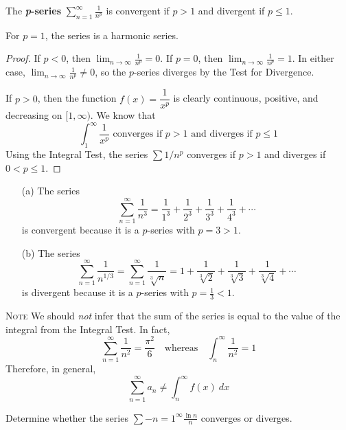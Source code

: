   \begin{definition}
    The \textbf{\textit{p}-series} $\displaystyle\sum_{n=1}^{\infty} \frac{1}{n^p}$ is convergent if $p>1$ and divergent if $p\leq 1$.
  \end{definition}
  For $p=1$, the series is a harmonic series.
  \begin{proof}\let\qed\relax
    If $p<0$, then $\displaystyle\lim_{n\to\infty} \frac{1}{n^p} = 0$. If $p=0$, then $\displaystyle\lim_{n\to\infty} \frac{1}{n^p} = 1$. In either case, $\displaystyle\lim_{n\to\infty} \frac{1}{n^p} \neq 0$, so the $p$-series diverges by the Test for Divergence.\par
    If $p>0$, then the function $f(x) = \dfrac{1}{x^p}$ is clearly continuous, positive, and decreasing on $[1,\infty)$. We know that $$\int_{1}^{\infty} \frac{1}{x^p} \text{ converges if } p>1 \text{ and diverges if } p\leq 1$$
    Using the Integral Test, the series $\sum 1/n^p$ converges if $p>1$ and diverges if $0<p\leq1$.
  \end{proof}
  \begin{example}
    \hphantom{ \\}
    \begin{enumerate}
      \item[(a)] The series $$\sum_{n=1}^{\infty} \frac{1}{n^3} = \frac{1}{1^3}+\frac{1}{2^3}+\frac{1}{3^3}+\frac{1}{4^3}+\cdots$$ is convergent because it is a $p$-series with $p=3>1$.
      \item[(b)] The series $$\sum_{n=1}^{\infty} \frac{1}{n^{1/3}} = \sum_{n=1}^{\infty} \frac{1}{\sqrt[3]{n}} = 1 + \frac{1}{\sqrt[3]{2}}+\frac{1}{\sqrt[3]{3}}+\frac{1}{\sqrt[3]{4}}+\cdots$$ is divergent because it is a $p$-series with $p=\frac{1}{3}<1$.
    \end{enumerate}
    \textsc{Note} We should \textit{not} infer that the sum of the series is equal to the value of the integral from the Integral Test. In fact, $$\sum_{n=1}^{\infty} \frac{1}{n^2} = \frac{\pi^2}{6} \quad\text{whereas}\quad \int_{n}^{\infty} \frac{1}{n^2}=1$$
    Therefore, in general, $$\sum_{n=1}^{\infty} a_n \neq \int_{n}^{\infty} f(x)\ dx$$
  \end{example}
  \begin{example}
    Determine whether the series $\displaystyle\sum-{n=1}^{\infty} \frac{\ln n}{n}$ converges or diverges.
  \end{example}
